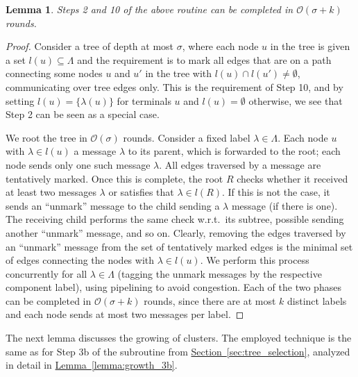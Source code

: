 \documentclass[letterpaper,11pt]{article}
\newtheorem{lemma}[theorem]{Lemma}
\newcommand{\namedref}[2]{\hyperref[#2]{#1~\ref*{#2}}}
\newcommand{\sectionref}[1]{\namedref{Section}{#1}}
\newcommand{\lemmaref}[1]{\namedref{Lemma}{#1}}
\newcommand{\BO}{\mathcal{O}}
\newcommand{\Comp}{\lambda}
\begin{document}
\begin{lemma}\label{lemma:prune_2_10}
Steps 2 and 10 of the above routine can be completed in $\BO(\sigma+k)$ rounds.
\end{lemma}
\begin{proof}
Consider a tree of depth at most $\sigma$, where each node $u$ in the tree is
given a set $l(u)\subseteq \Lambda$ and the requirement is to mark all edges
that are on a path connecting some nodes $u$ and $u'$ in the tree with $l(u)\cap
l(u')\neq \emptyset$, communicating over tree edges only. This is the
requirement of Step 10, and by setting $l(u)=\{\Comp(u)\}$ for terminals $u$ and
$l(u)=\emptyset$ otherwise, we see that Step 2 can be seen as a special case.

We root the tree in $\BO(\sigma)$ rounds. Consider a fixed label $\Comp \in
\Lambda$. Each node $u$ with $\Comp\in l(u)$ a message $\Comp$ to its parent,
which is forwarded to the root; each node sends only one such message $\Comp$.
All edges traversed by a message are tentatively marked. Once this is complete,
the root $R$ checks whether it received at least two messages $\Comp$ or
satisfies that $\Comp\in l(R)$. If this is not the case, it sends an ``unmark''
message to the child sending a $\Comp$ message (if there is one). The receiving
child performs the same check w.r.t.\ its subtree, possible sending another
``unmark'' message, and so on. Clearly, removing the edges traversed by an
``unmark'' message from the set of tentatively marked edges is the minimal set
of edges connecting the nodes with $\Comp \in l(u)$. We perform this process
concurrently for all $\Comp \in \Lambda$ (tagging the unmark messages by the
respective component label), using pipelining to avoid congestion. Each of
the two phases can be completed in $\BO(\sigma+k)$ rounds, since there are at
most $k$ distinct labels and each node sends at most two messages per label.
\end{proof}

The next lemma discusses the growing of clusters. The employed technique is the
same as for Step 3b of the subroutine from \sectionref{sec:tree_selection},
analyzed in detail in \lemmaref{lemma:growth_3b}.
\end{document}

